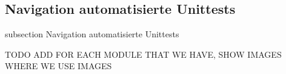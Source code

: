 



\subsection*{Navigation automatisierte Unittests}\label{nav-unittests}
    {subsection}
    {Navigation automatisierte Unittests}

TODO ADD FOR EACH MODULE THAT WE HAVE, SHOW IMAGES WHERE WE USE IMAGES